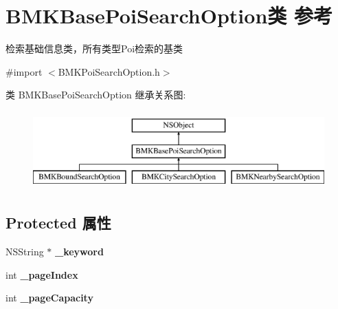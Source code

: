 \hypertarget{interface_b_m_k_base_poi_search_option}{\section{B\+M\+K\+Base\+Poi\+Search\+Option类 参考}
\label{interface_b_m_k_base_poi_search_option}
}


检索基础信息类，所有类型\+Poi检索的基类  




{\ttfamily \#import $<$B\+M\+K\+Poi\+Search\+Option.\+h$>$}

类 B\+M\+K\+Base\+Poi\+Search\+Option 继承关系图\+:\begin{figure}[H]
\begin{center}
\leavevmode
\includegraphics[height=3.000000cm]{interface_b_m_k_base_poi_search_option}
\end{center}
\end{figure}
\subsection*{Protected 属性}
\begin{DoxyCompactItemize}
\item 
\hypertarget{interface_b_m_k_base_poi_search_option_aec623956bb8cfc11c5d5959c6cf698da}{N\+S\+String $\ast$ {\bfseries \+\_\+keyword}}\label{interface_b_m_k_base_poi_search_option_aec623956bb8cfc11c5d5959c6cf698da}

\item 
\hypertarget{interface_b_m_k_base_poi_search_option_a9d3de22e269b9f69806e8f0b077d039f}{int {\bfseries \+\_\+page\+Index}}\label{interface_b_m_k_base_poi_search_option_a9d3de22e269b9f69806e8f0b077d039f}

\item 
\hypertarget{interface_b_m_k_base_poi_search_option_aa2e8a12a6101e57ec5e384f1cef92429}{int {\bfseries \+\_\+page\+Capacity}}\label{interface_b_m_k_base_poi_search_option_aa2e8a12a6101e57ec5e384f1cef92429}

\end{DoxyCompactItemize}
